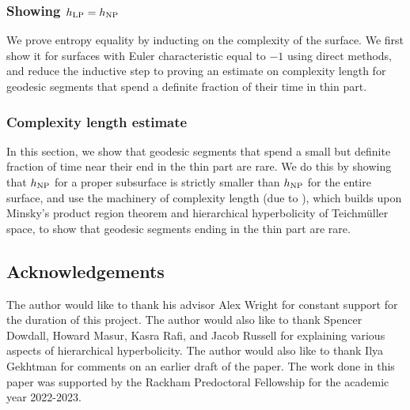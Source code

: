 \subsubsection*{Showing $h_{\mathrm{LP}} = h_{\mathrm{NP}}$}
We prove entropy equality by inducting on the complexity of the surface.
We first show it for surfaces with Euler characteristic equal to $-1$ using direct methods, and reduce the inductive step to proving an estimate on complexity length for geodesic segments that spend a definite fraction of their time in thin part.

\subsubsection*{Complexity length estimate}

In this section, we
show that geodesic segments that spend a small but definite fraction of time near their end in the thin part are rare.
We do this by showing that $h_{\mathrm{NP}}$ for a proper subsurface is strictly smaller than $h_{\mathrm{NP}}$ for the entire surface, and use the machinery of complexity length (due to \textcite{dowdall2023lattice}), which builds upon Minsky's product region theorem and hierarchical hyperbolicity of Teichmüller space, to show that geodesic segments ending in the thin part are rare.

\subsection*{Acknowledgements}

The author would like to thank his advisor Alex Wright for constant support for the duration of this project.
The author would also like to thank Spencer Dowdall, Howard Masur, Kasra Rafi, and Jacob Russell for explaining various aspects of hierarchical hyperbolicity.
The author would also like to thank Ilya Gekhtman for comments on an earlier draft of the paper.
The work done in this paper was supported by the Rackham Predoctoral Fellowship for the academic year 2022-2023.




